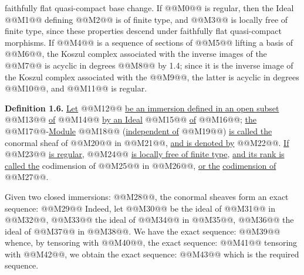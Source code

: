 faithfully flat quasi-compact base change. If @@M0@@ is regular, then the Ideal @@M1@@ defining @@M2@@ is of finite type, and @@M3@@ is locally free of finite type, since these properties descend under faithfully flat quasi-compact morphisms. If @@M4@@ is a sequence of sections of @@M5@@ lifting a basis of @@M6@@, the Koszul complex associated with the inverse images of the @@M7@@ is acyclic in degrees @@M8@@ by 1.4; since it is the inverse image of the Koszul complex associated with the @@M9@@, the latter is acyclic in degrees @@M10@@, and @@M11@@ is regular.

\textbf{Definition 1.6.} \uline{Let} @@M12@@ \uline{be an immersion defined in an open subset} @@M13@@ \uline{of} @@M14@@ \uline{by an Ideal} @@M15@@ \uline{of} @@M16@@; \uline{the} @@M17@@-\uline{Module} @@M18@@ (\uline{independent of} @@M19@@) \uline{is called the} conormal sheaf of @@M20@@ in @@M21@@, \uline{and is denoted by} @@M22@@. \uline{If} @@M23@@ \uline{is regular}, @@M24@@ \uline{is locally free of finite type}, \uline{and its rank is called the} codimension of @@M25@@ in @@M26@@, \uline{or the} \uline{codimension of} @@M27@@.

Given two closed immersions: @@M28@@, the conormal sheaves form an exact sequence:
@@M29@@
Indeed, let @@M30@@ be the ideal of @@M31@@ in @@M32@@, @@M33@@ the ideal of @@M34@@ in @@M35@@, @@M36@@ the ideal of @@M37@@ in @@M38@@. We have the exact sequence:
@@M39@@
whence, by tensoring with @@M40@@, the exact sequence:
@@M41@@
tensoring with @@M42@@, we obtain the exact sequence:
@@M43@@
which is the required sequence.
